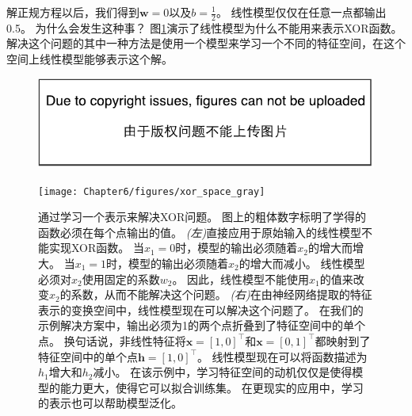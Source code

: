 解正规方程以后，我们得到$\bm{w} = 0$以及$b = \frac{1}{2}$。
线性模型仅仅在任意一点都输出0.5。
为什么会发生这种事？
图\ref{fig:chap6_xor_space_gray}演示了线性模型为什么不能用来表示XOR函数。
解决这个问题的其中一种方法是使用一个模型来学习一个不同的特征空间，在这个空间上线性模型能够表示这个解。
\begin{figure}[!htb]
\ifOpenSource
\centerline{\includegraphics{figure.pdf}}
\else
\centerline{\texttt{[image: Chapter6/figures/xor\_space\_gray]}}
\fi
\captionsetup{singlelinecheck=off}
\caption{通过学习一个表示来解决XOR问题。
图上的粗体数字标明了学得的函数必须在每个点输出的值。
\emph{(左)}直接应用于原始输入的线性模型不能实现XOR函数。
当$x_1 = 0$时，模型的输出必须随着$x_2$的增大而增大。
当$x_1 = 1$时，模型的输出必须随着$x_2$的增大而减小。
线性模型必须对$x_2$使用固定的系数$w_2$。
因此，线性模型不能使用$x_1$的值来改变$x_2$的系数，从而不能解决这个问题。 
\emph{(右)}在由神经网络提取的特征表示的变换空间中，线性模型现在可以解决这个问题了。
在我们的示例解决方案中，输出必须为1的两个点折叠到了特征空间中的单个点。
换句话说，非线性特征将$\bm{x} = [1, 0]^\top$和$\bm{x} = [0, 1]^\top$都映射到了特征空间中的单个点$\bm{h} = [1, 0]^\top$。
线性模型现在可以将函数描述为$h_1$增大和$h_2$减小。
在该示例中，学习特征空间的动机仅仅是使得模型的能力更大，使得它可以拟合训练集。
在更现实的应用中，学习的表示也可以帮助模型泛化。}
\label{fig:chap6_xor_space_gray}
\end{figure}


